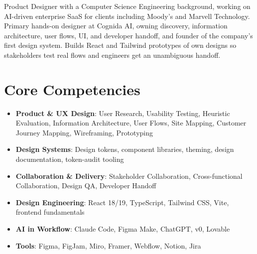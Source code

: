 \documentclass[11pt,a4paper,sans]{moderncv}
\begin{document}
\makecvtitle


\vspace{6pt}
\small{Product Designer with a Computer Science Engineering background, working on AI-driven enterprise SaaS for clients including Moody's and Marvell Technology. Primary hands-on designer at Cognida AI, owning discovery, information architecture, user flows, UI, and developer handoff, and founder of the company's first design system. Builds React and Tailwind prototypes of own designs so stakeholders test real flows and engineers get an unambiguous handoff.}


\section{Core Competencies}
\vspace{1pt}
\begin{itemize}

\item \textbf{Product \& UX Design}: User Research, Usability Testing, Heuristic Evaluation, Information Architecture, User Flows, Site Mapping, Customer Journey Mapping, Wireframing, Prototyping

\item \textbf{Design Systems}: Design tokens, component libraries, theming, design documentation, token-audit tooling

\item \textbf{Collaboration \& Delivery}: Stakeholder Collaboration, Cross-functional Collaboration, Design QA, Developer Handoff

\item \textbf{Design Engineering}: React 18/19, TypeScript, Tailwind CSS, Vite, frontend fundamentals

\item \textbf{AI in Workflow}: Claude Code, Figma Make, ChatGPT, v0, Lovable

\item \textbf{Tools}: Figma, FigJam, Miro, Framer, Webflow, Notion, Jira

\end{itemize}
\end{document}
